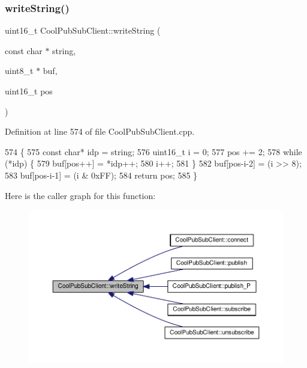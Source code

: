 \subsubsection{\texorpdfstring{write\+String()}{writeString()}}
{\footnotesize\ttfamily uint16\+\_\+t Cool\+Pub\+Sub\+Client\+::write\+String (\begin{DoxyParamCaption}\item[{const char $\ast$}]{string,  }\item[{uint8\+\_\+t $\ast$}]{buf,  }\item[{uint16\+\_\+t}]{pos }\end{DoxyParamCaption})\hspace{0.3cm}{\ttfamily [private]}}



Definition at line 574 of file Cool\+Pub\+Sub\+Client.\+cpp.


\begin{DoxyCode}
574                                                                                      \{
575     \textcolor{keyword}{const} \textcolor{keywordtype}{char}* idp = string;
576     uint16\_t i = 0;
577     pos += 2;
578     \textcolor{keywordflow}{while} (*idp) \{
579         buf[pos++] = *idp++;
580         i++;
581     \}
582     buf[pos-i-2] = (i >> 8);
583     buf[pos-i-1] = (i & 0xFF);
584     \textcolor{keywordflow}{return} pos;
585 \}
\end{DoxyCode}
Here is the caller graph for this function\+:\nopagebreak
\begin{figure}[H]
\begin{center}
\leavevmode
\includegraphics[width=350pt]{d8/d4b/class_cool_pub_sub_client_a0e3d7e776d4cf4427f9569b28868905a_icgraph}
\end{center}
\end{figure}


